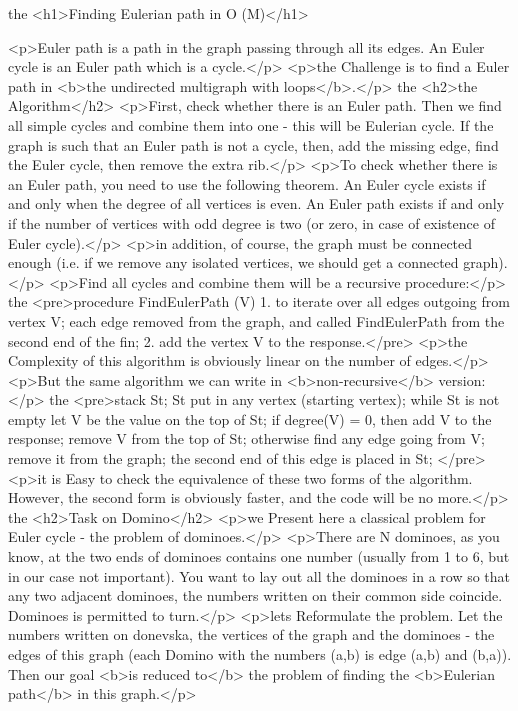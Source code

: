 the <h1>Finding Eulerian path in O (M)</h1>

<p>Euler path is a path in the graph passing through all its edges. An Euler cycle is an Euler path which is a cycle.</p>
<p>the Challenge is to find a Euler path in <b>the undirected multigraph with loops</b>.</p>
the <h2>the Algorithm</h2>
<p>First, check whether there is an Euler path. Then we find all simple cycles and combine them into one - this will be Eulerian cycle. If the graph is such that an Euler path is not a cycle, then, add the missing edge, find the Euler cycle, then remove the extra rib.</p>
<p>To check whether there is an Euler path, you need to use the following theorem. An Euler cycle exists if and only when the degree of all vertices is even. An Euler path exists if and only if the number of vertices with odd degree is two (or zero, in case of existence of Euler cycle).</p>
<p>in addition, of course, the graph must be connected enough (i.e. if we remove any isolated vertices, we should get a connected graph).</p>
<p>Find all cycles and combine them will be a recursive procedure:</p>
the <pre>procedure FindEulerPath (V)
1. to iterate over all edges outgoing from vertex V;
each edge removed from the graph, and
called FindEulerPath from the second end of the fin;
2. add the vertex V to the response.</pre>
<p>the Complexity of this algorithm is obviously linear on the number of edges.</p>
<p>But the same algorithm we can write in <b>non-recursive</b> version:</p>
the <pre>stack St;
St put in any vertex (starting vertex);
while St is not empty
let V be the value on the top of St;
if degree(V) = 0, then
add V to the response;
remove V from the top of St;
otherwise
find any edge going from V;
remove it from the graph;
the second end of this edge is placed in St;
</pre>
<p>it is Easy to check the equivalence of these two forms of the algorithm. However, the second form is obviously faster, and the code will be no more.</p>
the <h2>Task on Domino</h2>
<p>we Present here a classical problem for Euler cycle - the problem of dominoes.</p>
<p>There are N dominoes, as you know, at the two ends of dominoes contains one number (usually from 1 to 6, but in our case not important). You want to lay out all the dominoes in a row so that any two adjacent dominoes, the numbers written on their common side coincide. Dominoes is permitted to turn.</p>
<p>lets Reformulate the problem. Let the numbers written on donevska, the vertices of the graph and the dominoes - the edges of this graph (each Domino with the numbers (a,b) is edge (a,b) and (b,a)). Then our goal <b>is reduced to</b> the problem of finding the <b>Eulerian path</b> in this graph.</p>
